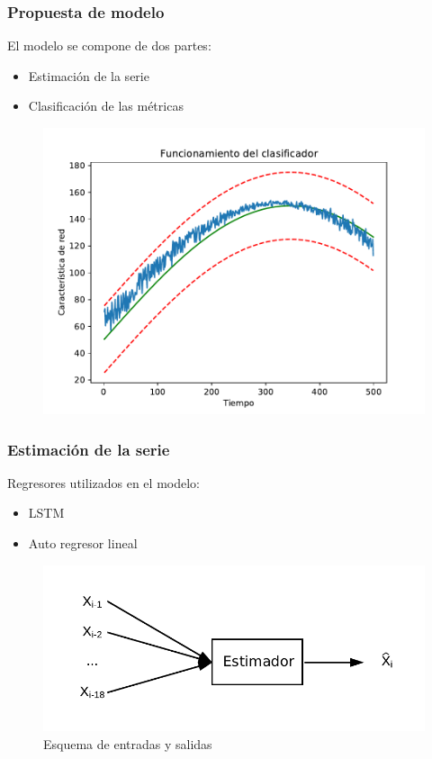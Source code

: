 \documentclass{beamer}
\begin{document}
\begin{frame}
\frametitle{Propuesta de modelo}
El modelo se compone de dos partes:
\begin{itemize}
\item Estimación de la serie
\item Clasificación de las métricas
\end{itemize}

\begin{figure}[htb]
\begin{center}
\includegraphics[scale=0.5]{imagenes/funcionamiento.pdf} 
\end{center}
\end{figure}

\end{frame}

\begin{frame}
\frametitle{Estimación de la serie}

Regresores utilizados en el modelo:
\begin{itemize}
\item LSTM
\item Auto regresor lineal
\end{itemize}

\begin{figure}[htb]
\begin{center}
\includegraphics[scale=0.5]{imagenes/estimador.pdf} 
\caption{Esquema de entradas y salidas}
\end{center}
\end{figure}

\end{frame}
\end{document}
